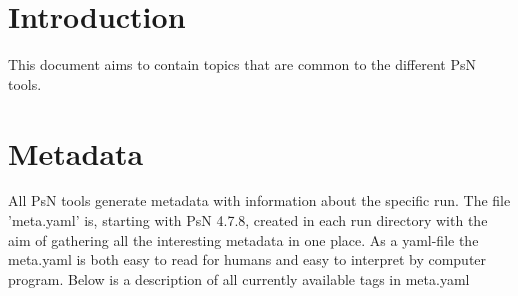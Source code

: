 

\usepackage{tabularx}





\maketitle
\newcommand{\guidetoolname}{<toolname>}

\section{Introduction}
This document aims to contain topics that are common to the different PsN tools.

\section{Metadata}
All PsN tools generate metadata with information about the specific run. The file 'meta.yaml' is, starting with PsN 4.7.8, created in each run directory with the aim of gathering all the interesting metadata in one place. As a yaml-file the meta.yaml is both easy to read for humans and easy to interpret by computer program. Below is a description of all currently available tags in meta.yaml

